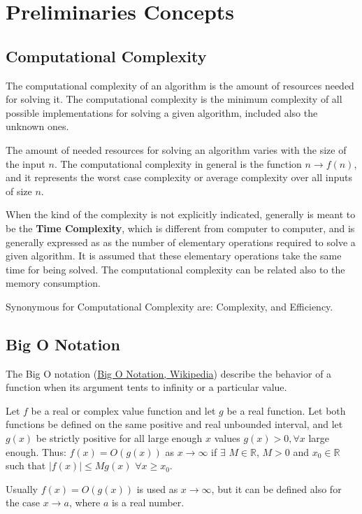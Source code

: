 \setchapterpreamble[u]{\margintoc}
\chapter{Preliminaries Concepts}


\section{Computational Complexity}
The computational complexity of an algorithm is the amount of resources needed for solving it. The computational complexity is the minimum complexity of all possible implementations for solving a given algorithm, included also the unknown ones.

The amount of needed resources for solving an algorithm varies with the size of the input \(n\). The computational complexity in general is the function \(n \rightarrow f(n)\), and it represents the worst case complexity or average complexity over all inputs of size \(n\).

When the kind of the complexity is not explicitly indicated, generally is meant to be the \textbf{Time Complexity}, which is different from computer to computer, and is generally expressed as as the number of elementary operations required to solve a given algorithm. It is assumed that these elementary operations take the same time for being solved. The computational complexity can be related also to the memory consumption.

Synonymous  for Computational Complexity are: Complexity, and Efficiency.

\section{Big O Notation}
The Big O notation \cite{wikipediabigo} (\href{https://en.wikipedia.org/wiki/Big_O_notation}{Big O Notation, Wikipedia}) describe the behavior of a function when its argument tents to infinity or a particular value.

\begin{definition}
Let \(f\) be a real or complex value function and let \(g\) be a real function. Let both functions be defined on the same positive and real unbounded interval, and let \(g(x)\) be strictly positive for all large enough \(x\) values \(g(x) > 0, \forall x\) large enough. Thus: \(f(x)=O(g(x)) \) as \(x \rightarrow \infty \) if \(\exists\) \(M \in \mathbb{R} \), \(M>0\) and \(x_{0} \in \mathbb{R} \) such that \(|f(x)| \leq Mg(x)\) \(\forall x \geq x_{0}\). 
\end{definition}
Usually \(f(x)=O(g(x))\) is used as \(x \rightarrow \infty\), but it can be defined also for the case \(x \rightarrow a\), where \(a\) is a real number.

